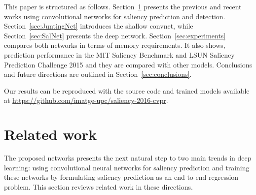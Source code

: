 \documentclass[10pt,twocolumn,letterpaper]{article}
\begin{document}

This paper is structured as follows. Section~\ref{sec:RelatedWork} presents the previous and recent works using convolutional networks for saliency prediction and detection.
Section~\ref{sec:JuntingNet} introduces the shallow convnet, while Section~\ref{sec:SalNet} presents the deep network.
Section~\ref{sec:experiments} compares both networks in terms of memory requirements. It also shows, prediction performance in the MIT Saliency Benchmark and LSUN Saliency Prediction Challenge 2015 and they are compared with other models.
Conclusions and future directions are outlined in Section~\ref{sec:conclusions}.

Our results can be reproduced with the source code and trained models available at \url{https://github.com/imatge-upc/saliency-2016-cvpr}.
\section{Related work}\label{sec:RelatedWork}

The proposed networks presents the next natural step to two main trends in deep learning: using convolutional neural networks for saliency prediction and training these networks by formulating saliency prediction as an end-to-end regression problem.
This section reviews related work in these directions.
\end{document}
